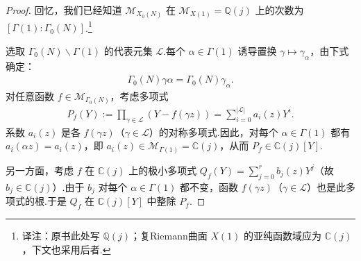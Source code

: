 \begin{proof}

回忆，我们已经知道 $\mathcal M_{X_0(N)}$ 在 $\mathcal M_{X(1)}=\mathbb Q(j)$ 上的次数为 $[\Gamma(1):\Gamma_0(N)]$.\footnote{译注：原书此处写 $\mathbb Q(j)$；复Riemann曲面 $X(1)$ 的亚纯函数域应为 $\mathbb C(j)$，下文也采用后者.}



选取 $\Gamma_0(N)\backslash\Gamma(1)$ 的代表元集 $\mathcal L$.每个 $\alpha\in\Gamma(1)$ 诱导置换 $\gamma\mapsto\gamma_\alpha$，由下式确定：
\begin{align*}
\Gamma_0(N)\gamma\alpha=\Gamma_0(N)\gamma_\alpha.
\end{align*}
对任意函数 $f\in\mathcal M_{\Gamma_0(N)}$，考虑多项式
\begin{align*}
P_f(Y):=\prod_{\gamma\in\mathcal L}(Y-f(\gamma z))=\sum_{i=0}^{|\mathcal L|}a_i(z)Y^i.
\end{align*}
系数 $a_i(z)$ 是各 $f(\gamma z)$（$\gamma\in\mathcal L$）的对称多项式.因此，对每个 $\alpha\in\Gamma(1)$ 都有 $a_i(\alpha z)=a_i(z)$，即 $a_i(z)\in\mathcal M_{\Gamma(1)}=\mathbb C(j)$，从而 $P_f\in\mathbb C(j)[Y]$.



另一方面，考虑 $f$ 在 $\mathbb C(j)$ 上的极小多项式 $Q_f(Y)=\sum_{j=0}^r b_j(z)Y^j$（故 $b_j\in\mathbb C(j)$）.由于 $b_j$ 对每个 $\alpha\in\Gamma(1)$ 都不变，函数 $f(\gamma z)$（$\gamma\in\mathcal L$）也是此多项式的根.于是 $Q_f$ 在 $\mathbb C(j)[Y]$ 中整除 $P_f$.




\end{proof}
